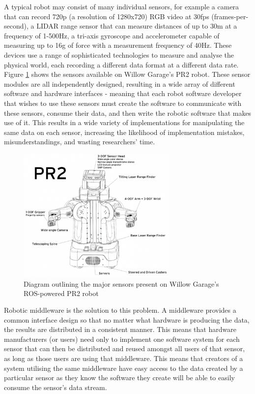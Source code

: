 \documentclass[../dissertation.tex]{subfiles}
\begin{document}
A typical robot may consist of many individual sensors, for example a camera that can record 720p (a resolution of 1280x720) RGB video at 30fps (frames-per-second), a LIDAR range sensor that can measure distances of up to 30m at a frequency of 1-500Hz, a tri-axis gyroscope and accelerometer capable of measuring up to 16g of force with a measurement frequency of 40Hz. These devices use a range of sophisticated technologies to measure and analyse the physical world, each recording a different data format at a different data rate. Figure \ref{pr2-diagram} shows the sensors available on Willow Garage's PR2 robot. These sensor modules are all independently designed, resulting in a wide array of different software and hardware interfaces - meaning that each robot software developer that wishes to use these sensors must create the software to communicate with these sensors, consume their data, and then write the robotic software that makes use of it. This results in a wide variety of implementations for manipulating the same data on each sensor, increasing the likelihood of implementation mistakes, misunderstandings, and wasting researchers' time.

\begin{figure}[H]
\centering

\includegraphics[width=0.7\textwidth]{images/background/Williow-Garage-PR2-Drawing-Diagram.png}
\caption{Diagram outlining the major sensors present on Willow Garage's ROS-powered PR2 robot\cite{pr2OverviewDiagram}}
\label{pr2-diagram}
\end{figure}

Robotic middleware is the solution to this problem. A middleware provides a common interface design so that no matter what hardware is producing the data, the results are distributed in a consistent manner. This means that hardware manufacturers (or users) need only to implement one software system for each sensor that can then be distributed and reused amongst all users of that sensor, as long as those users are using that middleware. This means that creators of a  system utilising the same middleware have easy access to the data created by a particular sensor as they know the software they create will be able to easily consume the sensor's data stream.
\end{document}

